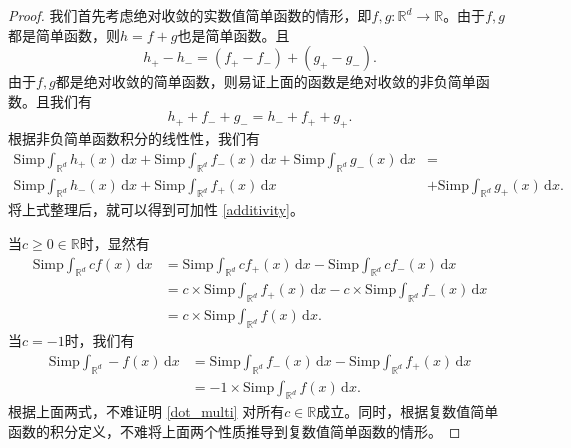 \documentclass[reqno,a4paper,14pt]{amsart}
\newcommand\dif{\,\mathrm{d}}
\begin{document}
\begin{proof}
    我们首先考虑绝对收敛的实数值简单函数的情形，即$f,g: \mathbb{R}^d\to \mathbb{R}$。由于$f,g$都是简单函数，则$h=f+g$也是简单函数。且
    \begin{equation*}
        h_+ - h_-=(f_+ - f_-)+(g_+ - g_-).
    \end{equation*}
    由于$f,g$都是绝对收敛的简单函数，则易证上面的函数是绝对收敛的非负简单函数。且我们有
    \begin{equation}
        h_+ + f_- + g_- = h_- + f_+ + g_+.
        \label{equivalence}
    \end{equation}
    根据非负简单函数积分的线性性，我们有
    \begin{equation*}
        \begin{split}
            \mathrm{Simp}\int_{\mathbb{R}^d} h_+(x)\dif x + \mathrm{Simp}\int_{\mathbb{R}^d} f_-(x)\dif x +\mathrm{Simp}\int_{\mathbb{R}^d} g_-(x)\dif x &=\\
            \mathrm{Simp}\int_{\mathbb{R}^d} h_-(x)\dif x + \mathrm{Simp}\int_{\mathbb{R}^d} f_+(x)\dif x &+ \mathrm{Simp}\int_{\mathbb{R}^d} g_+(x)\dif x.
        \end{split}
    \end{equation*}
    将上式整理后，就可以得到可加性 \eqref{additivity}。
    
    当$c\geq 0\in\mathbb{R}$时，显然有
    \begin{equation*}
        \begin{split}
            \mathrm{Simp}\int_{\mathbb{R}^d} c f(x)\dif x &= \mathrm{Simp}\int_{\mathbb{R}^d} c f_+(x)\dif x -\mathrm{Simp}\int_{\mathbb{R}^d} c f_-(x)\dif x\\
            &=c\times\mathrm{Simp} \int_{\mathbb{R}^d} f_+(x)\dif x - c\times\mathrm{Simp} \int_{\mathbb{R}^d} f_-(x)\dif x\\
            &=c\times\mathrm{Simp} \int_{\mathbb{R}^d} f(x)\dif x.
        \end{split}
    \end{equation*}
    当$c=-1$时，我们有
    \begin{equation*}
        \begin{split}
            \mathrm{Simp}\int_{\mathbb{R}^d} - f(x)\dif x &= \mathrm{Simp}\int_{\mathbb{R}^d}  f_-(x)\dif x -\mathrm{Simp}\int_{\mathbb{R}^d}  f_+(x)\dif x\\
            &=-1\times\mathrm{Simp} \int_{\mathbb{R}^d} f(x)\dif x.
        \end{split}
    \end{equation*}
    根据上面两式，不难证明 \eqref{dot_multi} 对所有$c\in \mathbb{R}$成立。同时，根据复数值简单函数的积分定义，不难将上面两个性质推导到复数值简单函数的情形。


\end{proof}
\end{document}
